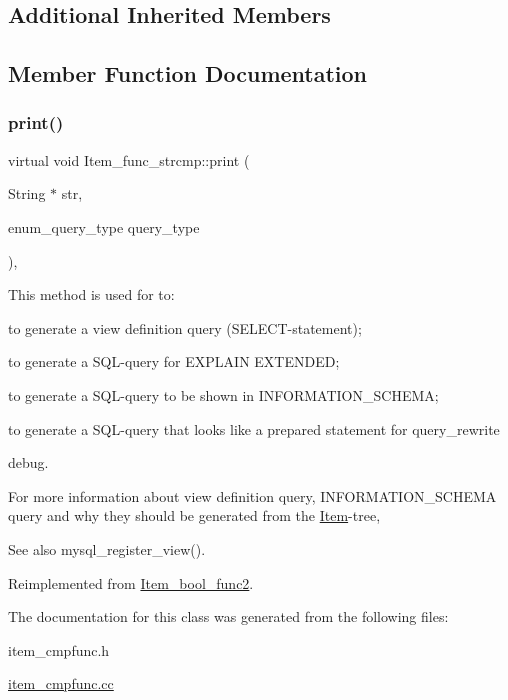 \subsection*{Additional Inherited Members}


\subsection{Member Function Documentation}
\mbox{\label{classItem__func__strcmp_a524a65bbd7fcff131c5ba9547cfe79e4}} 
\subsubsection{\texorpdfstring{print()}{print()}}
{\footnotesize\ttfamily virtual void Item\+\_\+func\+\_\+strcmp\+::print (\begin{DoxyParamCaption}\item[{String $\ast$}]{str,  }\item[{enum\+\_\+query\+\_\+type}]{query\+\_\+type }\end{DoxyParamCaption})\hspace{0.3cm}{\ttfamily [inline]}, {\ttfamily [virtual]}}

This method is used for to\+:
\begin{DoxyItemize}
\item to generate a view definition query (S\+E\+L\+E\+CT-\/statement);
\item to generate a S\+QL-\/query for E\+X\+P\+L\+A\+IN E\+X\+T\+E\+N\+D\+ED;
\item to generate a S\+QL-\/query to be shown in I\+N\+F\+O\+R\+M\+A\+T\+I\+O\+N\+\_\+\+S\+C\+H\+E\+MA;
\item to generate a S\+QL-\/query that looks like a prepared statement for query\+\_\+rewrite
\item debug.
\end{DoxyItemize}

For more information about view definition query, I\+N\+F\+O\+R\+M\+A\+T\+I\+O\+N\+\_\+\+S\+C\+H\+E\+MA query and why they should be generated from the \mbox{\hyperlink{classItem}{Item}}-\/tree, \begin{DoxySeeAlso}{See also}
mysql\+\_\+register\+\_\+view(). 
\end{DoxySeeAlso}


Reimplemented from \mbox{\hyperlink{classItem__bool__func2_a12469a240720c26bef325a4ee5b02f50}{Item\+\_\+bool\+\_\+func2}}.



The documentation for this class was generated from the following files\+:\begin{DoxyCompactItemize}
\item 
item\+\_\+cmpfunc.\+h\item 
\mbox{\hyperlink{item__cmpfunc_8cc}{item\+\_\+cmpfunc.\+cc}}\end{DoxyCompactItemize}

